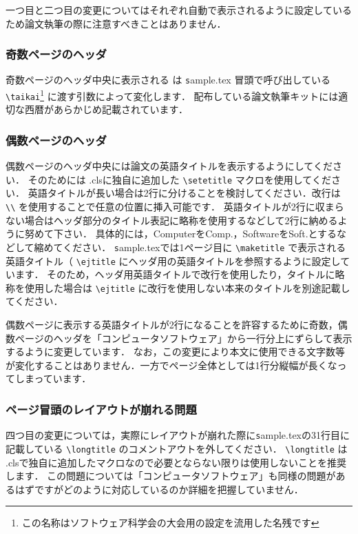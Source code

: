 \documentclass[T,J]{fose} %
\newcommand{\foseclassfile}{\MakeLowercase{\foseabbrev}.cls}
\begin{document}
一つ目と二つ目の変更についてはそれぞれ自動で表示されるように設定しているため論文執筆の際に注意すべきことはありません．


\subsubsection{奇数ページのヘッダ}
奇数ページのヘッダ中央に表示される {\textbf \foseabbrev } は {\texttt sample.tex } 冒頭で呼び出している \verb|\taikai|\footnote{この名称はソフトウェア科学会の大会用の設定を流用した名残です} に渡す引数によって変化します．
配布している論文執筆キットには適切な西暦があらかじめ記載されています．


\subsubsection{偶数ページのヘッダ}
偶数ページのヘッダ中央には論文の英語タイトルを表示するようにしてください．
そのためには \foseclassfile に独自に追加した \verb|\setetitle| マクロを使用してください．
英語タイトルが長い場合は2行に分けることを検討してください．改行は \verb|\\| を使用することで任意の位置に挿入可能です．
英語タイトルが2行に収まらない場合はヘッダ部分のタイトル表記に略称を使用するなどして2行に納めるように努めて下さい．
具体的には，ComputerをComp.，SoftwareをSoft.とするなどして縮めてください．
{\texttt sample.tex}では1ページ目に \verb|\maketitle| で表示される英語タイトル（ \verb|\ejtitle| にヘッダ用の英語タイトルを参照するように設定しています．
そのため，ヘッダ用英語タイトルで改行を使用したり，タイトルに略称を使用した場合は \verb|\ejtitle| に改行を使用しない本来のタイトルを別途記載してください．

偶数ページに表示する英語タイトルが2行になることを許容するために奇数，偶数ページのヘッダを「コンピュータソフトウェア」から一行分上にずらして表示するように変更しています．
なお，この変更により本文に使用できる文字数等が変化することはありません．一方でページ全体としては1行分縦幅が長くなってしまっています．


\subsubsection{ページ冒頭のレイアウトが崩れる問題}
四つ目の変更については，実際にレイアウトが崩れた際に{\texttt sample.tex}の31行目に記載している \verb|\longtitle| のコメントアウトを外してください．
\verb|\longtitle| は \foseclassfile で独自に追加したマクロなので必要とならない限りは使用しないことを推奨します．
この問題については「コンピュータソフトウェア」も同様の問題があるはずですがどのように対応しているのか詳細を把握していません．
\end{document}

